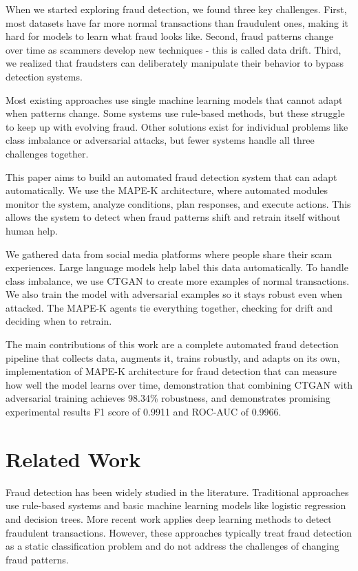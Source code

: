 \documentclass{svproc}
\begin{document}
When we started exploring fraud detection, we found three key challenges. First, most datasets have far more normal transactions than fraudulent ones, making it hard for models to learn what fraud looks like. Second, fraud patterns change over time as scammers develop new techniques - this is called data drift. Third, we realized that fraudsters can deliberately manipulate their behavior to bypass detection systems.

Most existing approaches use single machine learning models that cannot adapt when patterns change. Some systems use rule-based methods, but these struggle to keep up with evolving fraud. Other solutions exist for individual problems like class imbalance or adversarial attacks, but fewer systems handle all three challenges together.

This paper aims to build an automated fraud detection system that can adapt automatically. We use the MAPE-K architecture, where automated modules monitor the system, analyze conditions, plan responses, and execute actions. This allows the system to detect when fraud patterns shift and retrain itself without human help.

We gathered data from social media platforms where people share their scam experiences. Large language models help label this data automatically. To handle class imbalance, we use CTGAN to create more examples of normal transactions. We also train the model with adversarial examples so it stays robust even when attacked. The MAPE-K agents tie everything together, checking for drift and deciding when to retrain.

The main contributions of this work are a complete automated fraud detection pipeline that collects data, augments it, trains robustly, and adapts on its own, implementation of MAPE-K architecture for fraud detection that can measure how well the model learns over time, demonstration that combining CTGAN with adversarial training achieves 98.34\% robustness, and demonstrates promising experimental results F1 score of 0.9911 and ROC-AUC of 0.9966.

\section{Related Work}\label{sec:related}
Fraud detection has been widely studied in the literature. Traditional approaches use rule-based systems and basic machine learning models like logistic regression and decision trees. More recent work applies deep learning methods to detect fraudulent transactions. However, these approaches typically treat fraud detection as a static classification problem and do not address the challenges of changing fraud patterns.
\end{document}
